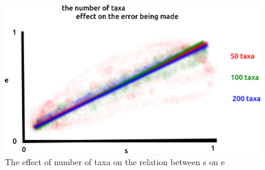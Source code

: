 \begin{figure}[!htbp]
  \includegraphics[width=\textwidth]{razzo-figures/fig_5.png}
  \caption{
    The effect of number of taxa on the relation between s on e
  }
  \label{fig:5}
\end{figure}